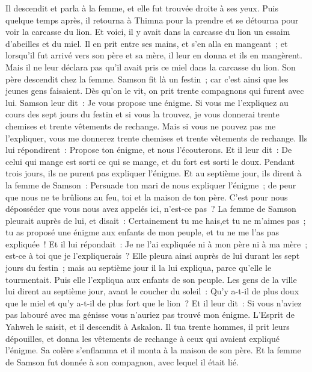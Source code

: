 \begin{multicols}{2}
Il descendit et parla à la femme, et elle fut trouvée droite à ses yeux.
Puis quelque temps après, il retourna à Thimna pour la prendre et se détourna pour voir la carcasse du lion. Et voici, il y avait dans la carcasse du lion un essaim d'abeilles et du miel.
Il en prit entre ses mains, et s'en alla en mangeant~; et lorsqu'il fut arrivé vers son père et sa mère, il leur en donna et ils en mangèrent. Mais il ne leur déclara pas qu'il avait pris ce miel dans la carcasse du lion.
Son père descendit chez la femme. Samson fit là un festin~; car c'est ainsi que les jeunes gens faisaient.
Dès qu'on le vit, on prit trente compagnons qui furent avec lui.
Samson leur dit~: Je vous propose une énigme. Si vous me l'expliquez au cours des sept jours du festin et si vous la trouvez, je vous donnerai trente chemises et trente vêtements de rechange.
Mais si vous ne pouvez pas me l'expliquer, vous me donnerez trente chemises et trente vêtements de rechange. Ils lui répondirent~: Propose ton énigme, et nous l'écouterons.
Et il leur dit~: De celui qui mange est sorti ce qui se mange, et du fort est sorti le doux. Pendant trois jours, ils ne purent pas expliquer l'énigme.
Et au septième jour, ils dirent à la femme de Samson~: Persuade ton mari de nous expliquer l'énigme~; de peur que nous ne te brûlions au feu, toi et la maison de ton père. C'est pour nous déposséder que vous nous avez appelés ici, n'est-ce pas~?
La femme de Samson pleurait auprès de lui, et disait~: Certainement tu me hais,et tu ne m'aimes pas~; tu as proposé une énigme aux enfants de mon peuple, et tu ne me l'as pas expliquée~! Et il lui répondait~: Je ne l'ai expliquée ni à mon père ni à ma mère~; est-ce à toi que je l'expliquerais~?
Elle pleura ainsi auprès de lui durant les sept jours du festin~; mais au septième jour il la lui expliqua, parce qu'elle le tourmentait. Puis elle l'expliqua aux enfants de son peuple.
Les gens de la ville lui dirent au septième jour, avant le coucher du soleil~: Qu'y a-t-il de plus doux que le miel et qu'y a-t-il de plus fort que le lion~? Et il leur dit~: Si vous n'aviez pas labouré avec ma génisse vous n'auriez pas trouvé mon énigme.
L'Esprit de Yahweh le saisit, et il descendit à Askalon. Il tua trente hommes, il prit leurs dépouilles, et donna les vêtements de rechange à ceux qui avaient expliqué l'énigme. Sa colère s'enflamma et il monta à la maison de son père.
Et la femme de Samson fut donnée à son compagnon, avec lequel il était lié.

\end{multicols}
